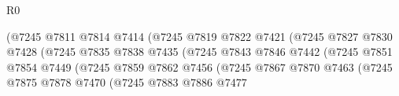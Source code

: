 \begin{lexlean}{R0}
\begin{coremodule}
                                                  (@7245
                                                    @7811
                                                    @7814
                                                    @7414
                                                    (@7245
                                                      @7819
                                                      @7822
                                                      @7421
                                                      (@7245
                                                        @7827
                                                        @7830
                                                        @7428
                                                        (@7245
                                                          @7835
                                                          @7838
                                                          @7435
                                                          (@7245
                                                            @7843
                                                            @7846
                                                            @7442
                                                            (@7245
                                                              @7851
                                                              @7854
                                                              @7449
                                                              (@7245
                                                                @7859
                                                                @7862
                                                                @7456
                                                                (@7245
                                                                  @7867
                                                                  @7870
                                                                  @7463
                                                                  (@7245
                                                                    @7875
                                                                    @7878
                                                                    @7470
                                                                    (@7245
                                                                      @7883
                                                                      @7886
                                                                      @7477

\end{coremodule}
\end{lexlean}
